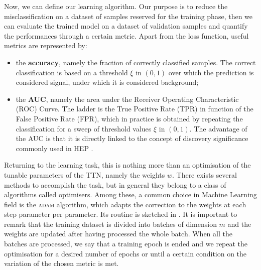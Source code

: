 \documentclass[../main/main.tex]{subfiles}
\begin{document}
Now, we can define our learning algorithm. Our purpose is to reduce the misclassification on a dataset of samples reserved for the training phase, then we can evaluate the trained model on a dataset of validation samples and quantify the performances through a certain metric. Apart from the loss function, useful metrics are represented by:
\begin{itemize}
    \item the \textbf{accuracy}, namely the fraction of correctly classified samples. The correct classification is based on a threshold \( \xi \) in \( (0,1) \) over which the prediction is considered signal, under which it is considered background;
    \item the \textbf{AUC}, namely the area under the Receiver Operating Characteristic (ROC) Curve. The ladder is the True Positive Rate (TPR) in function of the False Positive Rate (FPR), which in practice is obtained by repeating the classification for a sweep of threshold values \( \xi \) in \( (0,1) \). The advantage of the AUC is that it is directly linked to the concept of discovery significance commonly used in HEP \cite{baldi}.
\end{itemize}

Returning to the learning task, this is nothing more than an optimisation of the tunable parameters of the TTN, namely the weights \( w \). There exists several methods to accomplish the task, but in general they belong to a class of algorithms called optimisers. Among these, a common choice in Machine Learning field is the \textsc{adam} algorithm, which adapts the correction to the weights at each step parameter per parameter. Its routine is sketched in . It is important to remark that the training dataset is divided into batches of dimension \( m \) and the weights are updated after having processed the whole batch. When all the batches are processed, we say that a training epoch is ended and we repeat the optimisation for a desired number of epochs or until a certain condition on the variation of the chosen metric is met.
\end{document}
